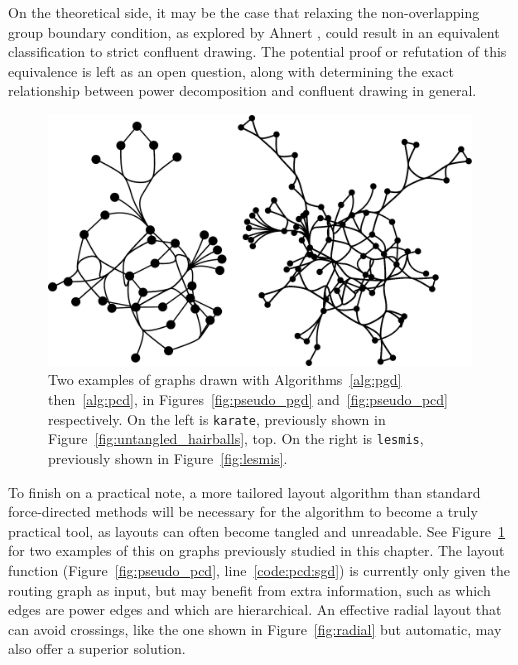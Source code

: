 On the theoretical side, it may be the case that relaxing the non-overlapping group boundary condition, as explored by Ahnert \cite{Ahnert2014}, could result in an equivalent classification to strict confluent drawing.
The potential proof or refutation of this equivalence is left as an open question, along with determining the exact relationship between power decomposition and confluent drawing in general.

\begin{figure}
  \centering
  \includegraphics[width=\linewidth]{power/power_karate_lesmis.pdf}
  \caption[Examples of networks drawn with the power-confluent algorithm]{Two examples of graphs drawn with Algorithms~\ref{alg:pgd} then~\ref{alg:pcd}, in Figures~\ref{fig:pseudo_pgd} and~\ref{fig:pseudo_pcd} respectively. On the left is \texttt{karate}, previously shown in Figure~\ref{fig:untangled_hairballs}, top. On the right is \texttt{lesmis}, previously shown in Figure~\ref{fig:lesmis}.}
  \label{fig:power_karate_lesmis}
\end{figure}

To finish on a practical note, a more tailored layout algorithm than standard force-directed methods will be necessary for the algorithm to become a truly practical tool, as layouts can often become tangled and unreadable. See Figure~\ref{fig:power_karate_lesmis} for two examples of this on graphs previously studied in this chapter.
The layout function (Figure~\ref{fig:pseudo_pcd}, line~\ref{code:pcd:sgd}) is currently only given the routing graph as input, but may benefit from extra information, such as which edges are power edges and which are hierarchical. An effective radial layout that can avoid crossings, like the one shown in Figure~\ref{fig:radial} but automatic, may also offer a superior solution.
